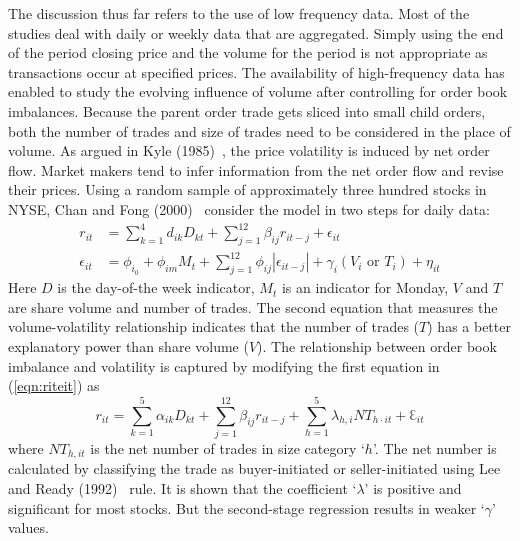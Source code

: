 The discussion thus far refers to the use of low frequency data. Most of the studies deal with daily or weekly data that are aggregated. Simply using the end of the period closing price and the volume for the period is not appropriate as transactions occur at specified prices. The availability of high-frequency data has enabled to study the evolving influence of volume after controlling for order book imbalances. Because the parent order trade gets sliced into small child orders, both the number of trades and size of trades need to be considered in the place of volume. As argued in Kyle (1985)~\cite{kyle1985}, the price volatility is induced by net order flow. Market makers tend to infer information from the net order flow and revise their prices. Using a random sample of approximately three hundred stocks in NYSE, Chan and Fong (2000)~\cite{chanfong} consider the model in two steps for daily data: 
	\begin{equation}\label{eqn:riteit}
	\begin{split}
	r_{it} &= \sum_{k=1}^4 d_{ik} D_{kt} + \sum_{j=1}^{12} \beta_{ij} r_{it-j} + \epsilon_{it} \\
	\epsilon_{it} &= \phi_{i_0} + \phi_{im} M_t + \sum_{j=1}^{12} \phi_{ij} |\epsilon_{it-j}| + \gamma_i (V_i \text{ or }T_i) + \eta_{it}
	\end{split}
	\end{equation}
Here $D$ is the day-of-the week indicator, $M_t$ is an indicator for Monday, $V$ and $T$ are share volume and number of trades. The second equation that measures the volume-volatility relationship indicates that the number of trades ($T$) has a better explanatory power than share volume ($V$). The relationship between order book imbalance and volatility is captured by modifying the first equation in (\ref{eqn:riteit}) as
	\begin{equation}\label{eqn:rit32}
	r_{it}=\sum_{k=1}^5 \alpha_{ik} D_{kt} + \sum_{j=1}^{12} \beta_{ij} r_{it-j} + \sum_{h=1}^5 \lambda_{h,i} N T_{h\cdot it} + \Eulerconst_{it}
	\end{equation}
where $NT_{h,it}$ is the net number of trades in size category `$h$'. The net number is calculated by classifying the trade as buyer-initiated or seller-initiated using Lee and Ready (1992)~\cite{leeready} rule. It is shown that the coefficient `$\lambda$' is positive and significant for most stocks. But the second-stage regression results in weaker `$\gamma$' values. 


